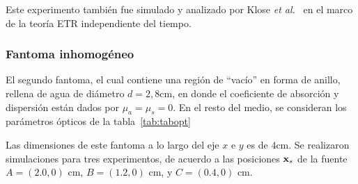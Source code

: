 Este experimento también fue simulado y analizado por Klose {\it et al.}~\cite{Klose2002}
en el marco de la teoría ETR independiente del tiempo.

\subsubsection{Fantoma inhomogéneo}

El segundo fantoma, el cual contiene una región de ``vacío'' en forma de anillo, 
rellena de agua de diámetro $d=2,8$cm, en donde el coeficiente de absorción 
y dispersión están dados por $\mu_a=\mu_s=0$. En el resto del medio, 
se consideran los parámetros ópticos de la tabla~\ref{tab:tabopt}

Las dimensiones de este fantoma a lo largo del eje $x$ e $y$ es de $4$cm.
Se realizaron simulaciones para tres experimentos, de acuerdo a las posiciones 
$\mathbf{x}_s$ de la fuente $A=(2.0,0)$ cm, $B=(1.2,0)$ cm, 
y $C=(0.4,0)$ cm.

